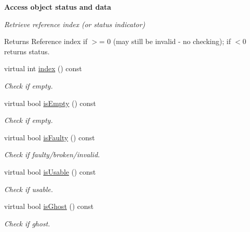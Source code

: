 \begin{Indent}{\bf Access object status and data}\par
{\em Retrieve reference index (or status indicator)

\begin{DoxyReturn}{Returns}
Reference index if $>$= 0 (may still be invalid -\/ no checking); if $<$0 returns status. 
\end{DoxyReturn}
}\begin{DoxyCompactItemize}
\item 
virtual int \hyperlink{classAnalysis_1_1FastJet_1_1UserInfo_a687e6a814e58e5737108ef24aef047df}{index} () const 
\begin{DoxyCompactList}\small\item\em Check if empty. \end{DoxyCompactList}\item 
virtual bool \hyperlink{classAnalysis_1_1FastJet_1_1UserInfo_a4b987d1bba6c854cf9310596abbd3572}{is\+Empty} () const 
\begin{DoxyCompactList}\small\item\em Check if empty. \end{DoxyCompactList}\item 
virtual bool \hyperlink{classAnalysis_1_1FastJet_1_1UserInfo_a74601c143cb58b3bb62e0842b416beed}{is\+Faulty} () const 
\begin{DoxyCompactList}\small\item\em Check if faulty/broken/invalid. \end{DoxyCompactList}\item 
virtual bool \hyperlink{classAnalysis_1_1FastJet_1_1UserInfo_ad7b1ceba9d2ab04e7e7000577fe95198}{is\+Usable} () const 
\begin{DoxyCompactList}\small\item\em Check if usable. \end{DoxyCompactList}\item 
virtual bool \hyperlink{classAnalysis_1_1FastJet_1_1UserInfo_a92d2abe359ed4b794c546a23a9e1ccbe}{is\+Ghost} () const 
\begin{DoxyCompactList}\small\item\em Check if ghost. \end{DoxyCompactList}\end{DoxyCompactItemize}
\end{Indent}
